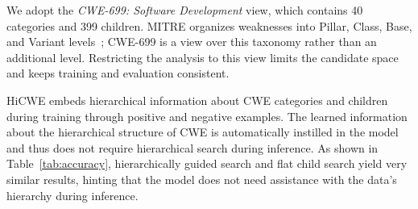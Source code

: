 \documentclass[conference,compsoc]{IEEEtran}
\begin{document}
We adopt the \emph{CWE-699: Software Development} view, which contains 40 categories and 399 children. MITRE organizes weaknesses into Pillar, Class, Base, and Variant levels~\cite{mitre_cwe_guidance}; CWE-699 is a view over this taxonomy rather than an additional level. Restricting the analysis to this view limits the candidate space and keeps training and evaluation consistent.

HiCWE embeds hierarchical information about CWE categories and children during training through positive and negative examples. The learned information about the hierarchical structure of CWE is automatically instilled in the model and thus does not require hierarchical search during inference. As shown in Table~\ref{tab:accuracy}, hierarchically guided search and flat child search yield very similar results, hinting that the model does not need assistance with the data’s hierarchy during inference.

\end{document}
